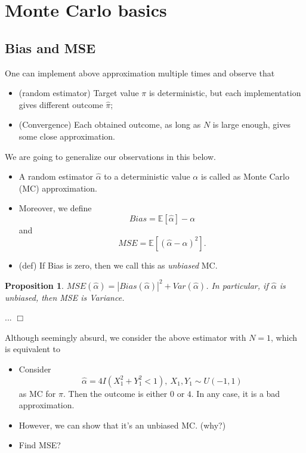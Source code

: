 \documentclass{article}
\newtheorem{proposition}[theorem]{Proposition}
\newenvironment{proof}{\noindent {\sc Proof:}}{$\Box$} %
\begin{document}
\section{Monte Carlo basics}

\subsection{Bias and MSE}
One can implement above approximation multiple times and observe that
\begin{itemize}
\item (random estimator) Target value $\pi$ is deterministic, but each implementation gives different outcome $\hat \pi$;
\item (Convergence) Each obtained outcome, as long as $N$ is large enough, gives some close approximation.
\end{itemize}

We are going to generalize our observations in this below. 
\begin{itemize}
\item
A random estimator $\hat \alpha$ to a deterministic value $\alpha$ is called as Monte Carlo (MC) approximation. 
\item Moreover, we define
$$Bias = \mathbb E [\hat \alpha] - \alpha$$
and 
$$MSE = \mathbb E [(\hat \alpha - \alpha)^2].$$
\item (def) If Bias is zero, then we call this as {\it unbiased} MC.
\end{itemize}

\begin{proposition}
 $MSE (\hat \alpha) = |Bias(\hat \alpha)|^2 + Var(\hat \alpha)$.
 In particular, if $\hat \alpha$ is unbiased, then MSE is Variance.
\end{proposition}
\begin{proof}
  ...
\end{proof}


Although seemingly absurd, we consider the above estimator with $N = 1$, which is equivalent to 
\begin{itemize}
 \item Consider 
 $$\hat \alpha = 4 I(X_1^2 + Y_1^2 <1), \ X_1, Y_1 \sim U(-1, 1)$$ 
 as MC for $\pi$. Then the outcome is either $0$ or $4$. In any case, it is a bad approximation. 
 \item However, we can show that it's an unbiased MC. (why?)
 \item Find MSE?
\end{itemize}
\end{document}
